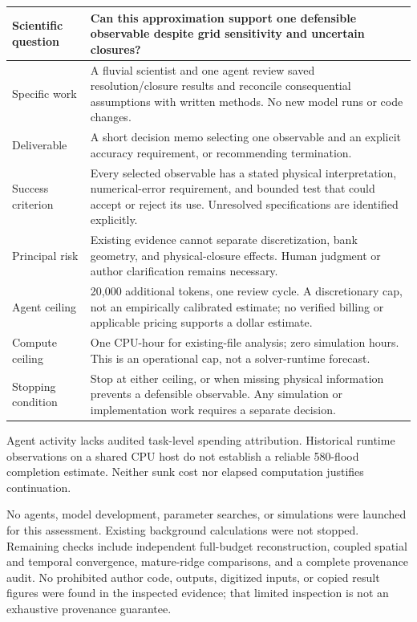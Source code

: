 \documentclass[10pt,letterpaper]{article}
\begin{document}
\begin{center}\small
\begin{tabularx}{\linewidth}{>{\raggedright\arraybackslash}p{1.25in}X}\toprule
Scientific question & Can this approximation support one defensible observable despite grid sensitivity and uncertain closures?\\\midrule
Specific work & A fluvial scientist and one agent review saved resolution/closure results and reconcile consequential assumptions with written methods. No new model runs or code changes.\\
Deliverable & A short decision memo selecting one observable and an explicit accuracy requirement, or recommending termination.\\
Success criterion & Every selected observable has a stated physical interpretation, numerical-error requirement, and bounded test that could accept or reject its use. Unresolved specifications are identified explicitly.\\
Principal risk & Existing evidence cannot separate discretization, bank geometry, and physical-closure effects. Human judgment or author clarification remains necessary.\\
Agent ceiling & 20,000 additional tokens, one review cycle. A discretionary cap, not an empirically calibrated estimate; no verified billing or applicable pricing supports a dollar estimate.\\
Compute ceiling & One CPU-hour for existing-file analysis; zero simulation hours. This is an operational cap, not a solver-runtime forecast.\\
Stopping condition & Stop at either ceiling, or when missing physical information prevents a defensible observable. Any simulation or implementation work requires a separate decision.\\\bottomrule
\end{tabularx}
\end{center}

Agent activity lacks audited task-level spending attribution. Historical runtime observations on a shared CPU host do not establish a reliable 580-flood completion estimate. Neither sunk cost nor elapsed computation justifies continuation.

No agents, model development, parameter searches, or simulations were launched for this assessment. Existing background calculations were not stopped. Remaining checks include independent full-budget reconstruction, coupled spatial and temporal convergence, mature-ridge comparisons, and a complete provenance audit. No prohibited author code, outputs, digitized inputs, or copied result figures were found in the inspected evidence; that limited inspection is not an exhaustive provenance guarantee.
\end{document}
